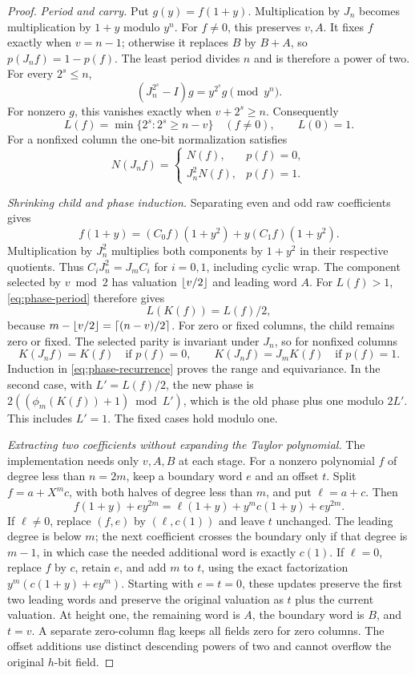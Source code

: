 \begin{proof}
\emph{Period and carry.}
Put $g(y)=f(1+y)$. Multiplication by $J_n$ becomes multiplication by
$1+y$ modulo $y^n$. For $f\ne0$, this preserves $v,A$. It fixes $f$
exactly when $v=n-1$; otherwise it replaces $B$ by $B+A$, so
$p(J_nf)=1-p(f)$. The least period divides $n$ and is therefore a power
of two. For every $2^s\le n$,
\[
 (J_n^{2^s}-I)g=y^{2^s}g\pmod {y^n}.
\]
For nonzero $g$, this vanishes exactly when $v+2^s\ge n$. Consequently
\begin{equation}\label{eq:phase-period}
 L(f)=\min\{2^s:2^s\ge n-v\}\quad(f\ne0),\qquad L(0)=1.
\end{equation}
For a nonfixed column the one-bit normalization satisfies
\[
 N(J_nf)=
 \begin{cases}N(f),&p(f)=0,\\J_n^2N(f),&p(f)=1.\end{cases}
\]

\emph{Shrinking child and phase induction.}
Separating even and odd raw coefficients gives
\begin{equation}\label{eq:phase-components}
 f(1+y)=(C_0f)(1+y^2)+y(C_1f)(1+y^2).
\end{equation}
Multiplication by $J_n^2$ multiplies both components by $1+y^2$ in
their respective quotients. Thus
$C_iJ_n^2=J_mC_i$ for $i=0,1$, including cyclic wrap.
The component selected by $v\bmod2$ has valuation $\left\lfloor v/2\right\rfloor$ and
leading word $A$. For $L(f)>1$, \cref{eq:phase-period} therefore gives
\[
 L(K(f))=L(f)/2,
\]
because $m-\left\lfloor v/2\right\rfloor=\left\lceil (n-v)/2\right\rceil$. For zero or fixed columns,
the child remains zero or fixed. The selected parity is invariant under
$J_n$, so for nonfixed columns
\[
 K(J_nf)=K(f)\quad\text{if }p(f)=0,\qquad
 K(J_nf)=J_mK(f)\quad\text{if }p(f)=1.
\]
Induction in \cref{eq:phase-recurrence} proves the range and equivariance.
In the second case, with $L'=L(f)/2$, the new phase is
$2((\phi_m(K(f))+1)\bmod L')$, which is the old phase plus one modulo
$2L'$. This includes $L'=1$. The fixed cases hold modulo one.

\emph{Extracting two coefficients without expanding the Taylor polynomial.}
The implementation needs only $v,A,B$ at each stage. For a nonzero
polynomial $f$ of degree less than $n=2m$, keep a boundary word $e$ and
an offset $t$. Split $f=a+X^mc$, with both halves of degree less than
$m$, and put $\ell=a+c$. Then
\[
 f(1+y)+ey^{2m}
 =\ell(1+y)+y^mc(1+y)+ey^{2m}.
\]
If $\ell\ne0$, replace $(f,e)$ by $(\ell,c(1))$ and leave $t$
unchanged. The leading degree is below $m$; the next coefficient crosses
the boundary only if that degree is $m-1$, in which case the needed
additional word is exactly $c(1)$. If $\ell=0$, replace $f$ by $c$,
retain $e$, and add $m$ to $t$, using the exact factorization
$y^m(c(1+y)+ey^m)$. Starting with $e=t=0$, these updates preserve
the first two leading words and preserve the original valuation as
$t$ plus the current valuation. At height one, the remaining word is
$A$, the boundary word is $B$, and $t=v$. A separate zero-column flag
keeps all fields zero for zero columns. The offset additions use distinct
descending powers of two and cannot overflow the original $h$-bit field.


\end{proof}
